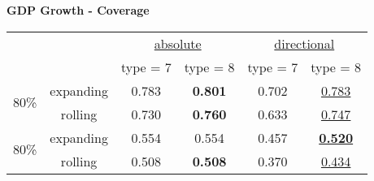 \documentclass{article}
\begin{document}
\Large{\textbf{GDP Growth - Coverage}}\bigskip
\normalsize
\begin{center}
\begin{tabular}{ cccc c  c  } 

&&\multicolumn{2}{c}{\underline{absolute}}&\multicolumn{2}{c}{\underline{directional}}\\
 && type = 7 & type = 8 & type = 7 & type = 8\\[0.8em]
\multirow{2}{4em}{80\%} &expanding & 0.783 & \textbf{0.801} & 0.702 & \underline{0.783}\\ 
&rolling & 0.730  & \textbf{0.760} & 0.633 & \underline{0.747}\\[0.5em]
\multirow{2}{4em}{80\%} &expanding & 0.554 & 0.554 & 0.457 & \underline{\textbf{0.520}}\\ 
&rolling & 0.508  & \textbf{0.508} & 0.370 & \underline{0.434}\\[0.5em]

\end{tabular}
\end{center}
\vspace{2cm}
\end{document}
